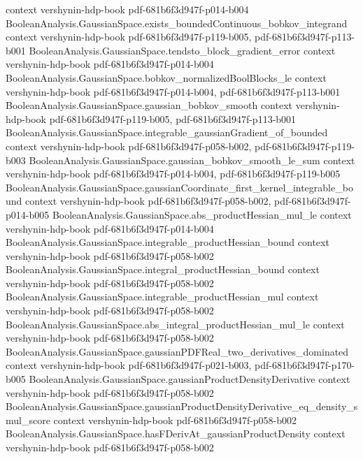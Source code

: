\begin{theorem}
  {context}
  {vershynin-hdp-book}
  {pdf-681b6f3d947f-p014-b004}
\proofstep
  {BooleanAnalysis.GaussianSpace.exists_boundedContinuous_bobkov_integrand}
  {context}
  {vershynin-hdp-book}
  {pdf-681b6f3d947f-p119-b005,
    pdf-681b6f3d947f-p113-b001}
\proofstep
  {BooleanAnalysis.GaussianSpace.tendsto_block_gradient_error}
  {context}
  {vershynin-hdp-book}
  {pdf-681b6f3d947f-p014-b004}
\proofstep
  {BooleanAnalysis.GaussianSpace.bobkov_normalizedBoolBlocks_le}
  {context}
  {vershynin-hdp-book}
  {pdf-681b6f3d947f-p014-b004,
    pdf-681b6f3d947f-p113-b001}
\proofstep
  {BooleanAnalysis.GaussianSpace.gaussian_bobkov_smooth}
  {context}
  {vershynin-hdp-book}
  {pdf-681b6f3d947f-p119-b005,
    pdf-681b6f3d947f-p113-b001}
\proofstep
  {BooleanAnalysis.GaussianSpace.integrable_gaussianGradient_of_bounded}
  {context}
  {vershynin-hdp-book}
  {pdf-681b6f3d947f-p058-b002,
    pdf-681b6f3d947f-p119-b003}
\proofstep
  {BooleanAnalysis.GaussianSpace.gaussian_bobkov_smooth_le_sum}
  {context}
  {vershynin-hdp-book}
  {pdf-681b6f3d947f-p014-b004,
    pdf-681b6f3d947f-p119-b005}
\proofstep
  {BooleanAnalysis.GaussianSpace.gaussianCoordinate_first_kernel_integrable_bound}
  {context}
  {vershynin-hdp-book}
  {pdf-681b6f3d947f-p058-b002,
    pdf-681b6f3d947f-p014-b005}
\proofstep
  {BooleanAnalysis.GaussianSpace.abs_productHessian_mul_le}
  {context}
  {vershynin-hdp-book}
  {pdf-681b6f3d947f-p014-b004}
\proofstep
  {BooleanAnalysis.GaussianSpace.integrable_productHessian_bound}
  {context}
  {vershynin-hdp-book}
  {pdf-681b6f3d947f-p058-b002}
\proofstep
  {BooleanAnalysis.GaussianSpace.integral_productHessian_bound}
  {context}
  {vershynin-hdp-book}
  {pdf-681b6f3d947f-p058-b002}
\proofstep
  {BooleanAnalysis.GaussianSpace.integrable_productHessian_mul}
  {context}
  {vershynin-hdp-book}
  {pdf-681b6f3d947f-p058-b002}
\proofstep
  {BooleanAnalysis.GaussianSpace.abs_integral_productHessian_mul_le}
  {context}
  {vershynin-hdp-book}
  {pdf-681b6f3d947f-p058-b002}
\proofstep
  {BooleanAnalysis.GaussianSpace.gaussianPDFReal_two_derivatives_dominated}
  {context}
  {vershynin-hdp-book}
  {pdf-681b6f3d947f-p021-b003,
    pdf-681b6f3d947f-p170-b005}
\proofstep
  {BooleanAnalysis.GaussianSpace.gaussianProductDensityDerivative}
  {context}
  {vershynin-hdp-book}
  {pdf-681b6f3d947f-p058-b002}
\proofstep
  {BooleanAnalysis.GaussianSpace.gaussianProductDensityDerivative_eq_density_smul_score}
  {context}
  {vershynin-hdp-book}
  {pdf-681b6f3d947f-p058-b002}
\proofstep
  {BooleanAnalysis.GaussianSpace.hasFDerivAt_gaussianProductDensity}
  {context}
  {vershynin-hdp-book}
  {pdf-681b6f3d947f-p058-b002}

\end{theorem}

